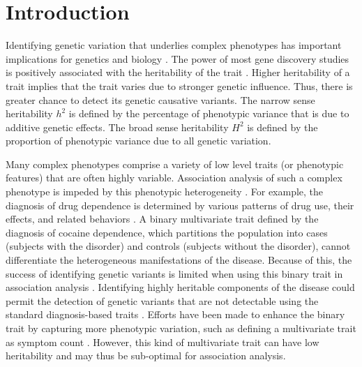 \documentclass[10pt,letterpaper]{article}
\begin{document}
\section*{Introduction}
\label{introduction}
Identifying genetic variation that underlies complex phenotypes has important implications for genetics and biology \cite{karp:genomics:2002,nature:gwas:2008}. 
The power of most gene discovery studies is positively associated with the heritability of the trait \cite{Balding2007}. Higher heritability of a trait implies that the trait varies due to stronger genetic influence. Thus, there is greater chance to detect its genetic causative variants. The narrow sense heritability $h^2$ is defined by the percentage of phenotypic variance that is due to additive genetic effects. The broad sense heritability $H^2$ is defined by the proportion of phenotypic variance due to all genetic variation. 

Many complex phenotypes comprise a variety of low level traits (or phenotypic features) that are often highly variable. Association analysis of such a complex phenotype is impeded by this phenotypic heterogeneity \cite{Girirajan:phhetero:2012}. For example, the diagnosis of drug dependence is determined by various patterns of drug use, their effects, and related behaviors \cite{pierucci:2007}. %
A binary multivariate trait defined by the diagnosis of cocaine dependence, which partitions the population into cases (subjects with the disorder) and controls (subjects without the disorder), cannot differentiate the heterogeneous manifestations of the disease. Because of this, the success of identifying genetic variants is limited when using this binary trait in association analysis \cite{Wang:2012:sd_genetic,Gelernter:CD:2014}. Identifying highly heritable components of the disease could permit the detection of genetic variants that are not detectable using the standard diagnosis-based traits \cite{VHu:autism:2011,bi:cdsubtype:2013,Kranzler:2008,Chan:2011,jinbo:subtyping:2011}. Efforts have been made to enhance the binary trait by capturing more phenotypic variation, such as defining a multivariate trait as symptom count \cite{Gelernter:CD:2014}. However, this kind of multivariate trait can have low heritability and may thus be sub-optimal for association analysis.
\end{document}
